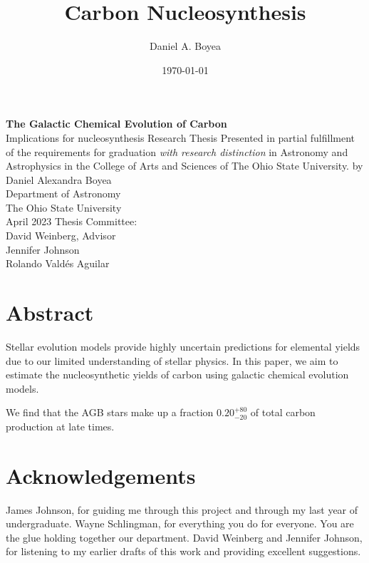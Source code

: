 \documentclass[12pt,oneside]{report}
\title{Carbon Nucleosynthesis}
\author{Daniel A. Boyea}
\date{\today}
\begin{document}


\begin{titlepage}
   \begin{center}
       \vfill
       \textbf{The Galactic Chemical Evolution of Carbon} \\
        Implications for nucleosynthesis
        \vfill
        Research Thesis
        \vfill
        Presented in partial fulfillment of the requirements for graduation \textit{with research distinction} in Astronomy and Astrophysics in the College of Arts and Sciences of The Ohio State University.
        \vfill
        by 
        \vfill
       {Daniel Alexandra Boyea}\\
       \vfill
       Department of Astronomy\\
       The Ohio State University\\
       \vfill
       April 2023
       \vfill
       Thesis Committee:\\
       David Weinberg, Advisor \\
       Jennifer Johnson \\
       Rolando Vald\'es Aguilar\\
       \vfill
            
   \end{center}
\end{titlepage}



\chapter*{Abstract}
Stellar evolution models provide highly uncertain predictions for elemental yields due to our limited understanding of stellar physics. In this paper, we aim to estimate the nucleosynthetic yields of carbon using galactic chemical evolution models. 

We find that the AGB stars make up a fraction $0.20_{-20}^{+80}$ of total carbon production at late times. 

\chapter*{Acknowledgements}

James Johnson, for guiding me through this project and through my last year of undergraduate.
Wayne Schlingman, for everything you do for everyone. You are the glue holding together our department.
David Weinberg and Jennifer Johnson, for listening to my earlier drafts of this work and providing excellent suggestions.
\end{document}
